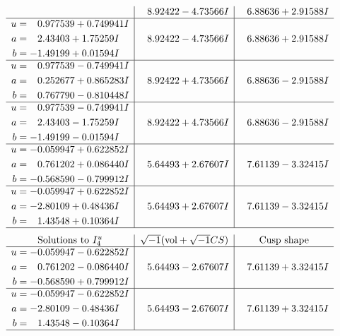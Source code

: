 \documentclass[1p]{elsarticle_modified}
\theoremstyle{definition}
\newcommand{\I}{\sqrt{-1}}
\begin{document}
$$\begin{array}{c|c|c}
 & \phantom{-}8.92422 - 4.73566 I & \phantom{-}6.88636 + 2.91588 I \\ \hline\begin{aligned}
u &= \phantom{-}0.977539 + 0.749941 I \\
a &= \phantom{-}2.43403 + 1.75259 I \\
b &= -1.49199 + 0.01594 I\end{aligned}
 & \phantom{-}8.92422 - 4.73566 I & \phantom{-}6.88636 + 2.91588 I \\ \hline\begin{aligned}
u &= \phantom{-}0.977539 - 0.749941 I \\
a &= \phantom{-}0.252677 + 0.865283 I \\
b &= \phantom{-}0.767790 - 0.810448 I\end{aligned}
 & \phantom{-}8.92422 + 4.73566 I & \phantom{-}6.88636 - 2.91588 I \\ \hline\begin{aligned}
u &= \phantom{-}0.977539 - 0.749941 I \\
a &= \phantom{-}2.43403 - 1.75259 I \\
b &= -1.49199 - 0.01594 I\end{aligned}
 & \phantom{-}8.92422 + 4.73566 I & \phantom{-}6.88636 - 2.91588 I \\ \hline\begin{aligned}
u &= -0.059947 + 0.622852 I \\
a &= \phantom{-}0.761202 + 0.086440 I \\
b &= -0.568590 - 0.799912 I\end{aligned}
 & \phantom{-}5.64493 + 2.67607 I & \phantom{-}7.61139 - 3.32415 I \\ \hline\begin{aligned}
u &= -0.059947 + 0.622852 I \\
a &= -2.80109 + 0.48436 I \\
b &= \phantom{-}1.43548 + 0.10364 I\end{aligned}
 & \phantom{-}5.64493 + 2.67607 I & \phantom{-}7.61139 - 3.32415 I\\
 \hline 
 \end{array}$$\newpage$$\begin{array}{c|c|c}  
\text{Solutions to }I^u_{4}& \I (\text{vol} + \sqrt{-1}CS) & \text{Cusp shape}\\
 \hline 
\begin{aligned}
u &= -0.059947 - 0.622852 I \\
a &= \phantom{-}0.761202 - 0.086440 I \\
b &= -0.568590 + 0.799912 I\end{aligned}
 & \phantom{-}5.64493 - 2.67607 I & \phantom{-}7.61139 + 3.32415 I \\ \hline\begin{aligned}
u &= -0.059947 - 0.622852 I \\
a &= -2.80109 - 0.48436 I \\
b &= \phantom{-}1.43548 - 0.10364 I\end{aligned}
 & \phantom{-}5.64493 - 2.67607 I & \phantom{-}7.61139 + 3.32415 I\\
 \hline 
 \end{array}$$\newpage\newpage\renewcommand{\arraystretch}{1}
\end{document}
